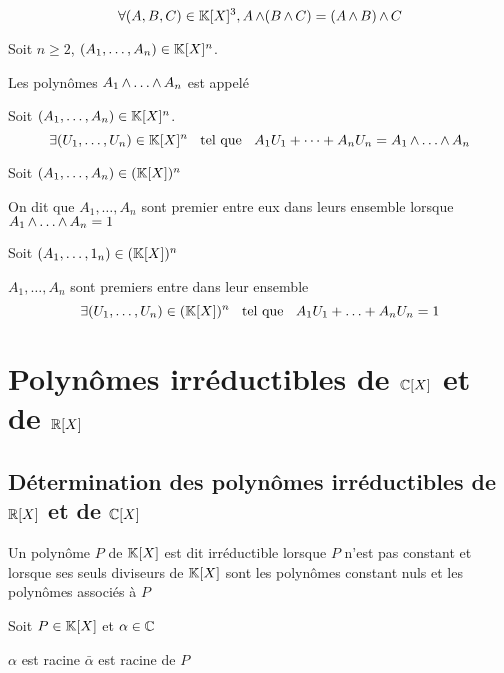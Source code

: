 \begin{prp}
  \[
    \forall (A, B, C) \in \mathbb{K}[X]^3, A \operatorname{\wedge} (B \operatorname{\wedge} C) = (A \operatorname{\wedge} B) \operatorname{\wedge} C
  \]
\end{prp}

\begin{dfn}
  Soit $n \geq 2$, $(A_1, \ldots, A_n) \in \mathbb{K}[X]^n$.

  Les polynômes $A_1 \operatorname{\wedge} \ldots \operatorname{\wedge} A_n$ est appelé
\end{dfn}

\begin{prp}
  Soit $(A_1, \ldots, A_n) \in \mathbb{K}[X]^n$.
  \[
    \exists (U_1, \ldots, U_n) \in \mathbb{K}[X]^n \;\;\text{ tel que }\;\; A_1 U_1 + \cdots + A_n U_n
    = A_1 \operatorname{\wedge} \ldots \operatorname{\wedge} A_n
  \]
\end{prp}

\begin{dfn}
Soit $(A_1, \ldots, A_n) \in (\mathbb{K}[X])^n$ 

On dit que $A_1, \ldots, A_n$ sont premier entre eux dans leurs
ensemble lorsque $A_1 \operatorname{\wedge} \ldots \operatorname{\wedge} A_n = 1$
\end{dfn}

\begin{thm}[Bézout]
Soit $(A_1, \ldots, 1_n) \in (\mathbb{K}[X])^n$

$A_1, \ldots, A_n$ sont premiers entre dans leur ensemble \ssi
\[
    \exists (U_1, \ldots, U_n) \in (\mathbb{K}[X])^n \;\;\text{ tel que }\;\;
    A_1 U_1 + \ldots + A_n U_n = 1
\]
\end{thm}

\section{Polynômes irréductibles de $\mathbb{C}[X]$ et de $\mathbb{R}[X]$}

\subsection{Détermination des polynômes irréductibles de $\mathbb{R}[X]$ et de
$\mathbb{C}[X]$}

\begin{dfn}
Un polynôme $P$ de $\mathbb{K}[X]$ est dit irréductible lorsque $P$ n'est pas
constant et lorsque ses seuls diviseurs de $\mathbb{K}[X]$ sont les polynômes
constant nuls et les polynômes associés à $P$
\end{dfn}

\begin{prp}
Soit $P \in \mathbb{K}[X]$ et $\alpha \in \mathbb{C}$

$\alpha$ est racine \ssi $\bar{\alpha}$ est racine de $P$
\end{prp}

